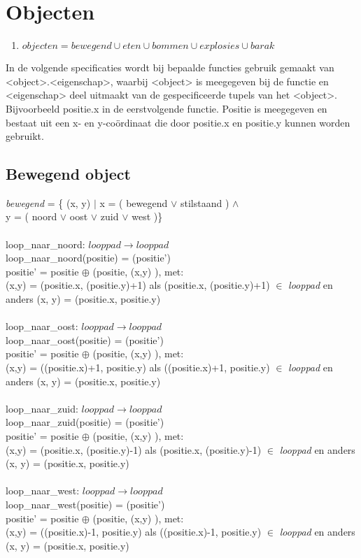 \section{Objecten}\label{sub:looppad} %
\begin{enumerate}
 \item $objecten = bewegend \cup eten \cup bommen \cup explosies \cup barak$ \\
\end{enumerate}

In de volgende specificaties wordt bij bepaalde functies gebruik gemaakt van <object>.<eigenschap>, waarbij <object> is meegegeven bij de functie en <eigenschap> deel uitmaakt van de gespecificeerde tupels van het <object>. Bijvoorbeeld positie.x in de eerstvolgende functie. Positie is meegegeven en bestaat uit een x- en y-co\"ordinaat die door positie.x en positie.y kunnen worden gebruikt.

\subsection{Bewegend object}\label{sec:beweging} %


\emph{bewegend} = \{ (x, y) $|$ x = ( bewegend $\lor$ stilstaand ) $\land$ \\  \indent \indent \indent \indent y = ( noord $\lor$ oost $\lor$ zuid $\lor$ west )\} \\ \\
loop\_naar\_noord: $looppad \rightarrow looppad$ \\
loop\_naar\_noord(positie) = (positie') \\
positie' = positie $\oplus$ (positie, (x,y) ), met: \\
(x,y) = (positie.x, (positie.y)+1) als (positie.x, (positie.y)+1) $\in$ \emph{looppad} en anders (x, y) = (positie.x, positie.y) \\ \\
loop\_naar\_oost: $looppad \rightarrow looppad$ \\
loop\_naar\_oost(positie) = (positie') \\
positie' = positie $\oplus$ (positie, (x,y) ), met: \\
(x,y) = ((positie.x)+1, positie.y) als ((positie.x)+1, positie.y) $\in$ \emph{looppad} en anders (x, y) = (positie.x, positie.y) \\ \\
loop\_naar\_zuid: $looppad \rightarrow looppad$ \\
loop\_naar\_zuid(positie) = (positie') \\
positie' = positie $\oplus$ (positie, (x,y) ), met: \\
(x,y) = (positie.x, (positie.y)-1) als (positie.x, (positie.y)-1) $\in$ \emph{looppad} en anders (x, y) = (positie.x, positie.y) \\ \\
loop\_naar\_west: $looppad \rightarrow looppad$ \\
loop\_naar\_west(positie) = (positie') \\
positie' = positie $\oplus$ (positie, (x,y) ), met: \\
(x,y) = ((positie.x)-1, positie.y) als ((positie.x)-1, positie.y) $\in$ \emph{looppad} en anders (x, y) = (positie.x, positie.y)

